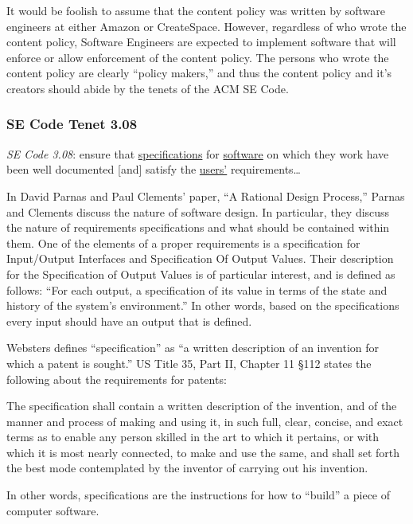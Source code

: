 \documentclass[11pt]{article}
\begin{document}
\begin{multicols}{2}
It would be foolish to assume that the content policy was written by software engineers at either Amazon or CreateSpace.  However, regardless of who wrote the content policy, Software Engineers are expected to implement software that will enforce or allow enforcement of the content policy.  The persons who wrote the content policy are clearly ``policy makers,'' and thus the content policy and it's creators should abide by the tenets of the ACM SE Code.

\subsubsection{SE Code Tenet 3.08}

\emph{SE Code 3.08}: ensure that \underline{specifications} for \underline{software} on which they work have been well documented [and] satisfy the \underline{users'} requirements\ldots 

In David Parnas and Paul Clements' paper, ``A Rational Design Process,'' Parnas and Clements discuss the nature of software design. \cite{fakeit} In particular, they discuss the nature of requirements specifications and what should be contained within them.  One of the elements of a proper requirements is a specification for Input/Output Interfaces and Specification Of Output Values.  Their description for the Specification of Output Values is of particular interest, and is defined as follows: ``For each output, a specification of its value in terms of the state and history of the system's environment.'' \cite{fakeit} In other words, based on the specifications every input should have an output that is defined. 

Websters defines ``specification'' as ``a written description of an invention for which a patent is sought.'' \cite{WebsterOnlineDict}  US Title 35, Part II, Chapter 11 \S 112 states the following about the requirements for patents:

{\addtolength{\leftskip}{6mm}

The specification shall contain a written description of the invention, and of the manner and process of making and using it, in such full, clear, concise, and exact terms as to enable any person skilled in the art to which it pertains, or with which it is most nearly connected, to make and use the same, and shall set forth the best mode contemplated by the inventor of carrying out his invention.  \cite{Title35}

}

In other words, specifications are the instructions for how to ``build'' a piece of computer software.


\end{multicols}
\end{document}
